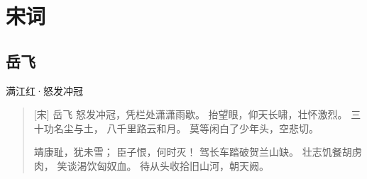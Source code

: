 \chapter{宋词}

\section{岳飞}

满江红·怒发冲冠\citep{岳飞:满江红}
\begin{verse}
    [宋] 岳飞
    怒发冲冠，凭栏处潇潇雨歇。
    抬望眼，仰天长啸，壮怀激烈。
    三十功名尘与土，
    八千里路云和月。
    莫等闲白了少年头，空悲切。

    靖康耻，犹未雪；
    臣子恨，何时灭！
    驾长车踏破贺兰山缺。
    壮志饥餐胡虏肉，
    笑谈渴饮匈奴血。
    待从头收拾旧山河，朝天阙。    
\end{verse}




